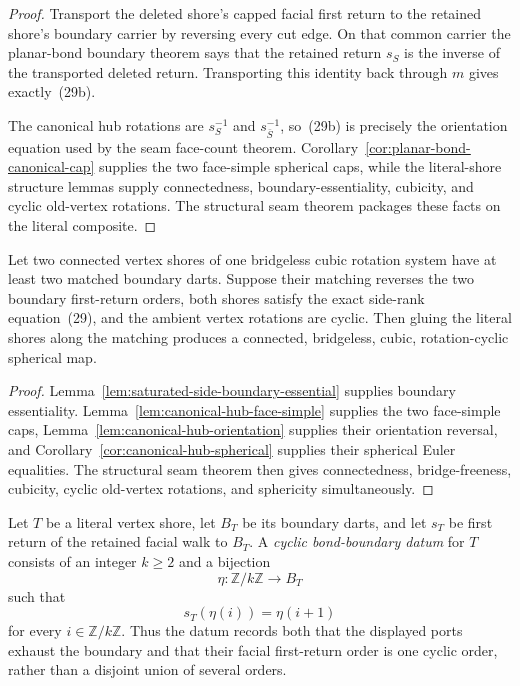 \begin{proof}
Transport the deleted shore's capped facial first return to the retained
shore's boundary carrier by reversing every cut edge.  On that common
carrier the planar-bond boundary theorem says that the retained return
\(s_S\) is the inverse of the transported deleted return.  Transporting
this identity back through \(m\) gives exactly~(29b).

The canonical hub rotations are \(s_S^{-1}\) and
\(s_{\bar S}^{-1}\), so~(29b) is precisely the orientation equation used by
the seam face-count theorem.  Corollary~\ref{cor:planar-bond-canonical-cap}
supplies the two face-simple spherical caps, while the literal-shore
structure lemmas supply connectedness, boundary-essentiality, cubicity, and
cyclic old-vertex rotations.  The structural seam theorem packages these
facts on the literal composite.
\end{proof}

\begin{corollary}
\label{cor:canonical-literal-shore-splice}
Let two connected vertex shores of one bridgeless cubic rotation system have
at least two matched boundary darts.  Suppose their matching reverses the
two boundary first-return orders, both shores satisfy the exact side-rank
equation~(29), and the ambient vertex rotations are cyclic.  Then gluing the
literal shores along the matching produces a connected, bridgeless, cubic,
rotation-cyclic spherical map.
\end{corollary}

\begin{proof}
Lemma~\ref{lem:saturated-side-boundary-essential} supplies boundary
essentiality.  Lemma~\ref{lem:canonical-hub-face-simple} supplies the two
face-simple caps, Lemma~\ref{lem:canonical-hub-orientation} supplies their
orientation reversal, and Corollary~\ref{cor:canonical-hub-spherical}
supplies their spherical Euler equalities.  The structural seam theorem then
gives connectedness, bridge-freeness, cubicity, cyclic old-vertex rotations,
and sphericity simultaneously.
\end{proof}

\begin{definition}
\label{def:cyclic-bond-boundary}
Let \(T\) be a literal vertex shore, let \(B_T\) be its boundary darts, and
let \(s_T\) be first return of the retained facial walk to \(B_T\).  A
\emph{cyclic bond-boundary datum} for \(T\) consists of an integer \(k\ge2\)
and a bijection
\[
             \eta:\mathbb Z/k\mathbb Z\longrightarrow B_T
\]
such that
\[
             s_T(\eta(i))=\eta(i+1)                 \tag{30}
\]
for every \(i\in\mathbb Z/k\mathbb Z\).  Thus the datum records both that
the displayed ports exhaust the boundary and that their facial first-return
order is one cyclic order, rather than a disjoint union of several orders.
\end{definition}

